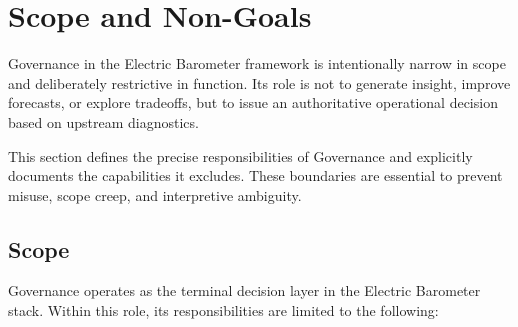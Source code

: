 
\section{Scope and Non-Goals}
\label{sec:governance_scope_nongoals}

Governance in the Electric Barometer framework is intentionally narrow in scope
and deliberately restrictive in function. Its role is not to generate insight,
improve forecasts, or explore tradeoffs, but to issue an authoritative operational
decision based on upstream diagnostics.

This section defines the precise responsibilities of Governance and explicitly
documents the capabilities it excludes. These boundaries are essential to
prevent misuse, scope creep, and interpretive ambiguity.

\subsection{Scope}

Governance operates as the terminal decision layer in the Electric Barometer
stack. Within this role, its responsibilities are limited to the following:

